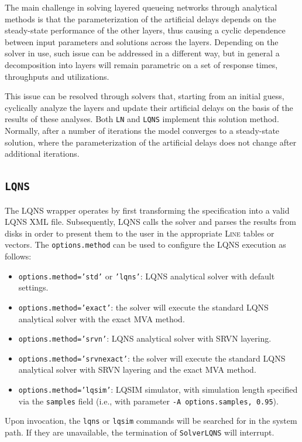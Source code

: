 The main challenge in solving layered queueing networks through analytical methods is that the parameterization of the artificial delays depends on the steady-state performance of the other layers, thus causing a cyclic dependence between input parameters and solutions across the layers. Depending on the solver in use, such issue can be addressed in a different way, but in general a decomposition into layers will remain parametric on a set of response times, throughputs and utilizations.

This issue can be resolved through solvers that, starting from an initial guess, cyclically analyze the layers and update their artificial delays on the basis of the results of these analyses. Both \texttt{LN} and \texttt{LQNS} implement this solution method. Normally, after a number of iterations the model converges to a steady-state solution, where the parameterization of the artificial delays does not change after additional iterations.

\subsection{\texttt{LQNS}}
The LQNS wrapper operates by first transforming the specification into a valid LQNS XML file. Subsequently, LQNS calls the solver and parses the results from disks in order to present them to the user in the appropriate \textsc{Line} tables or vectors. The \texttt{options.method} can be used to configure the LQNS execution as follows:
\begin{itemize}
\item \texttt{options.method='std'} or \texttt{'lqns'}: LQNS analytical solver with default settings.
\item \texttt{options.method='exact'}: the solver will execute the standard LQNS analytical solver with the exact MVA method.
\item \texttt{options.method='srvn'}: LQNS analytical solver with SRVN layering.
\item \texttt{options.method='srvnexact'}: the solver will execute the standard LQNS analytical solver with SRVN layering and  the exact MVA method.
\item \texttt{options.method='lqsim'}: LQSIM simulator, with simulation length specified via the \texttt{samples} field (i.e., with parameter \texttt{-A options.samples, 0.95}).
\end{itemize}

Upon invocation, the \texttt{lqns} or \texttt{lqsim} commands will be searched for in the system path. If they are unavailable, the termination of \texttt{SolverLQNS} will interrupt.

